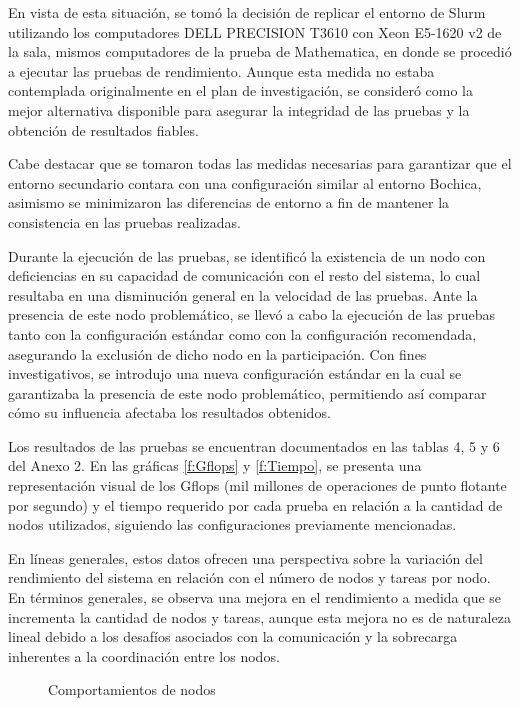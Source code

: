 \begin{spacing}{1.5}
  En vista de esta situación, se tomó la decisión de replicar el entorno de Slurm utilizando los computadores DELL PRECISION T3610 con Xeon E5-1620 v2 de la sala, mismos computadores de la prueba de Mathematica, en donde se procedió a ejecutar las pruebas de rendimiento. Aunque esta medida no estaba contemplada originalmente en el plan de investigación, se consideró como la mejor alternativa disponible para asegurar la integridad de las pruebas y la obtención de resultados fiables.

  Cabe destacar que se tomaron todas las medidas necesarias para garantizar que el entorno secundario contara con una configuración similar al entorno Bochica, asimismo se minimizaron las diferencias de entorno a fin de mantener la consistencia en las pruebas realizadas.

  Durante la ejecución de las pruebas, se identificó la existencia de un nodo con deficiencias en su capacidad de comunicación con el resto del sistema, lo cual resultaba en una disminución general en la velocidad de las pruebas. Ante la presencia de este nodo problemático, se llevó a cabo la ejecución de las pruebas tanto con la configuración estándar como con la configuración recomendada, asegurando la exclusión de dicho nodo en la participación. Con fines investigativos, se introdujo una nueva configuración estándar en la cual se garantizaba la presencia de este nodo problemático, permitiendo así comparar cómo su influencia afectaba los resultados obtenidos.

  Los resultados de las pruebas se encuentran documentados en las tablas 4, 5 y 6 del Anexo 2. En las gráficas \ref{f:Gflops} y \ref{f:Tiempo}, se presenta una representación visual de los Gflops (mil millones de operaciones de punto flotante por segundo) y el tiempo requerido por cada prueba en relación a la cantidad de nodos utilizados, siguiendo las configuraciones previamente mencionadas.

  En líneas generales, estos datos ofrecen una perspectiva sobre la variación del rendimiento del sistema en relación con el número de nodos y tareas por nodo. En términos generales, se observa una mejora en el rendimiento a medida que se incrementa la cantidad de nodos y tareas, aunque esta mejora no es de naturaleza lineal debido a los desafíos asociados con la comunicación y la sobrecarga inherentes a la coordinación entre los nodos.

  \begin{figure}
    \centering
    \caption{Comportamientos de nodos}
    \label{f:nodos}
  \end{figure}


\end{spacing}
